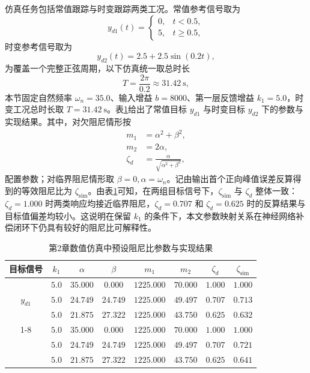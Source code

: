 仿真任务包括常值跟踪与时变跟踪两类工况。常值参考信号取为
\begin{equation}\label{eq:ch2_sim_ref1}
y_{d1}(t)=
\begin{cases}
0, & t<0.5,\\
5, & t\ge 0.5,
\end{cases}
\end{equation}
时变参考信号取为
\begin{equation}\label{eq:ch2_sim_ref2}
y_{d2}(t)=2.5+2.5\sin(0.2t),
\end{equation}
为覆盖一个完整正弦周期，以下仿真统一取总时长
\begin{equation}
T=\frac{2\pi}{0.2}\approx 31.42~\mathrm{s},
\end{equation}
本节固定自然频率 $\omega_n=35.0$、输入增益 $b=8000$、第一层反馈增益 $k_1=5.0$，时变工况总时长取 $T=31.42~\mathrm{s}$。表\ref{tab:ch2_sigma_param}给出了常值目标 $y_{d1}$ 与时变目标 $y_{d2}$ 下的参数与实现结果。其中，对欠阻尼情形按
\begin{subequations}
\begin{align}
m_1 &= \alpha^2+\beta^2,\\
m_2 &= 2\alpha,\\
\zeta_d &= \frac{\alpha}{\sqrt{\alpha^2+\beta^2}},
\end{align}
\end{subequations}
配置参数；对临界阻尼情形取 $\beta=0,\alpha=\omega_n$。记由输出首个正向峰值误差反算得到的等效阻尼比为 $\zeta_{\mathrm{sim}}$。由表\ref{tab:ch2_sigma_param}可知，在两组目标信号下，$\zeta_{\mathrm{sim}}$ 与 $\zeta_d$ 整体一致：$\zeta_d=1.000$ 时两类响应均接近临界阻尼，$\zeta_d=0.707$ 和 $\zeta_d=0.625$ 时的反算结果与目标值偏差均较小。这说明在保留 $k_1$ 的条件下，本文参数映射关系在神经网络补偿闭环下仍具有较好的阻尼比可解释性。

\begin{table}[!htbp]
  \centering
  \caption{第2章数值仿真中预设阻尼比参数与实现结果}
  \label{tab:ch2_sigma_param}
  \begin{tabular}{cccccccc}
    \toprule
    目标信号 & $k_1$ & $\alpha$ & $\beta$ & $m_1$ & $m_2$ & $\zeta_d$ & $\zeta_{\mathrm{sim}}$\\
    \midrule
    \multirow{3}{*}{$y_{d1}$} & $5.0$ & $35.000$ & $0.000$ & $1225.000$ & $70.000$ & $1.000$ & $1.000$ \\
     & $5.0$ & $24.749$ & $24.749$ & $1225.000$ & $49.497$ & $0.707$ & $0.713$ \\
     & $5.0$ & $21.875$ & $27.322$ & $1225.000$ & $43.750$ & $0.625$ & $0.632$ \\
    \cmidrule[0.1pt]{1-8}
    \multirow{3}{*}{$y_{d2}$} & $5.0$ & $35.000$ & $0.000$ & $1225.000$ & $70.000$ & $1.000$ & $1.000$ \\
     & $5.0$ & $24.749$ & $24.749$ & $1225.000$ & $49.497$ & $0.707$ & $0.721$ \\
     & $5.0$ & $21.875$ & $27.322$ & $1225.000$ & $43.750$ & $0.625$ & $0.641$ \\
    \bottomrule
  \end{tabular}
\end{table}
\FloatBarrier

